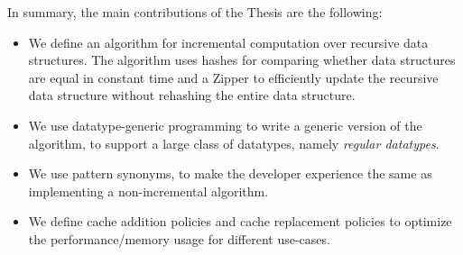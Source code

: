 In summary, the main contributions of the Thesis are the following:

\begin{itemize}
    \item We define an algorithm for incremental computation over recursive data structures. The algorithm uses hashes for comparing whether data structures are equal in constant time and a Zipper to efficiently update the recursive data structure without rehashing the entire data structure.
    \item We use datatype-generic programming to write a generic version of the algorithm, to support a large class of datatypes, namely \textit{regular datatypes}.
    \item We use pattern synonyms, to make the developer experience the same as implementing a non-incremental algorithm.
    \item We define cache addition policies and cache replacement policies to optimize the performance/memory usage for different use-cases.
\end{itemize}

